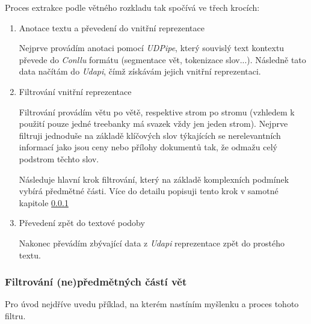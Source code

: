 \documentclass[thesis=M,czech]{FITthesis}[2019/12/23]
\begin{document}
Proces extrakce podle větného rozkladu tak spočívá ve třech krocích:
\begin{enumerate}
    \item Anotace textu a převedení do vnitřní reprezentace
    
    Nejprve provádím anotaci pomocí \textit{UDPipe}, který souvislý text kontextu převede do \textit{Conllu} formátu (segmentace vět, tokenizace slov...). Následně tato data načítám do \textit{Udapi}, čímž získávám jejich vnitřní reprezentaci.
    
    \item Filtrování vnitřní reprezentace
    
    Filtrování provádím větu po větě, respektive strom po stromu (vzhledem k použití pouze jedné treebanky má svazek vždy jen jeden strom). Nejprve filtruji jednoduše na základě klíčových slov týkajících se nerelevantních informací jako jsou ceny nebo přílohy dokumentů tak, že odmažu celý podstrom těchto slov.
    
    Následuje hlavní krok filtrování, který na základě komplexních podmínek vybírá předmětné části. Více do detailu popisuji tento krok v samotné kapitole \ref{sec:nonsubj_parts_filter}
    
    
    \item Převedení zpět do textové podoby
    
    Nakonec převádím zbývající data z \textit{Udapi} reprezentace zpět do prostého textu.
    
\end{enumerate}

\subsubsection{Filtrování (ne)předmětných částí vět}
\label{sec:nonsubj_parts_filter}

Pro úvod nejdříve uvedu příklad, na kterém nastíním myšlenku a proces tohoto filtru.
\end{document}
